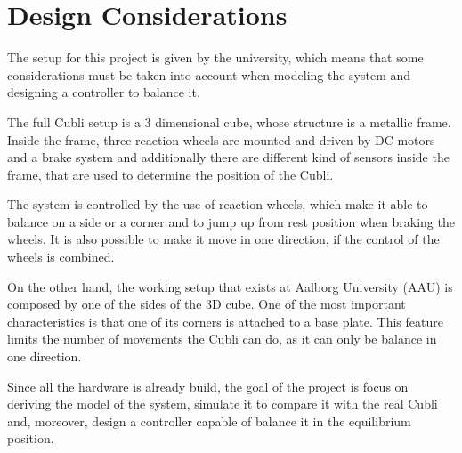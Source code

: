 \chapter{Design Considerations}

The setup for this project is given by the university, which means that some considerations must be taken into account when modeling the system and designing a controller to balance it.

The full Cubli setup is a 3 dimensional cube, whose structure is a metallic frame. Inside the frame, three reaction wheels are mounted and driven by DC motors and a brake system and additionally there are different kind of sensors inside the frame, that are used to determine the position of the Cubli.

The system is controlled by the use of reaction wheels, which make it able to balance on a side or a corner and to jump up from rest position when braking the wheels. It is also possible to make it move in one direction, if the control of the wheels is combined.%

On the other hand, the working setup that exists at Aalborg University (AAU) is composed by one of the sides of the 3D cube. One of the most important characteristics is that one of its corners is attached to a base plate. This feature limits the number of movements the Cubli can do, as it can only be balance in one direction.

Since all the hardware is already build, the goal of the project is focus on deriving the model of the system, simulate it to compare it with the real Cubli and, moreover, design a controller capable of balance it in the equilibrium position.

